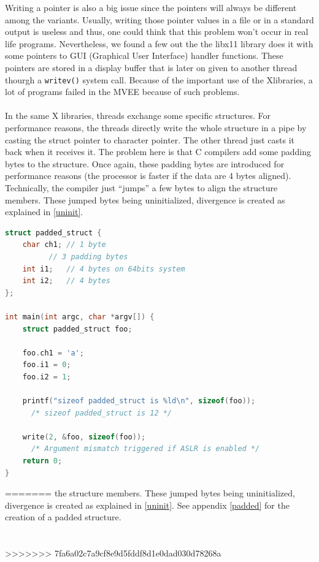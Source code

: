 \documentclass[english]{enstaPRE}
\begin{document}
Writing a pointer is also a big issue since the pointers will always be different among the variants.
Usually, writing those pointer values in a file or in a standard output is useless and thus, one could think that this problem won't occur in
real life programs. Nevertheless, we found a few out the the libx11 library does it with some pointers to GUI 
(Graphical User Interface) handler functions. These pointers are stored in a display buffer that is later on given to another thread 
thourgh a \texttt{writev()} system call.
Because of the important use of the Xlibraries, a lot of programs failed in the MVEE because of such problems.
\\ \\
In the same X libraries, threads exchange some specific structures. For performance reasons, the threads directly write the whole 
structure in a pipe by casting the struct pointer to character pointer. The other thread just casts it back when it receives it.
The problem here is that C compilers add some padding bytes to the structure. Once again, these padding bytes are introduced for performance
reasons (the processor is faster if the data are 4 bytes aligned). Technically, the compiler just ``jumps'' a few bytes to align 
the structure members. These jumped bytes being uninitialized, divergence is created as explained in \ref{uninit}. \\

\begin{lstlisting}[frame=single, caption=Writing a padded structure, label=lst:padstruct, language=C]
struct padded_struct {
    char ch1; // 1 byte
	      // 3 padding bytes
    int i1;   // 4 bytes on 64bits system
    int i2;   // 4 bytes
};

int main(int argc, char *argv[]) {
    struct padded_struct foo;
    
    foo.ch1 = 'a';
    foo.i1 = 0;
    foo.i2 = 1;
    
    printf("sizeof padded_struct is %ld\n", sizeof(foo)); 
      /* sizeof padded_struct is 12 */
    
    write(2, &foo, sizeof(foo));
      /* Argument mismatch triggered if ASLR is enabled */
    return 0;
}
\end{lstlisting}

=======
the structure members. These jumped bytes being uninitialized, divergence is created as explained in \ref{uninit}. See appendix \ref{padded} for the creation of a padded structure.
\\ \\ \\
>>>>>>> 7fa6a02c7a9cf8e9d5fddf8d1e0dad030d78268a
\end{document}
